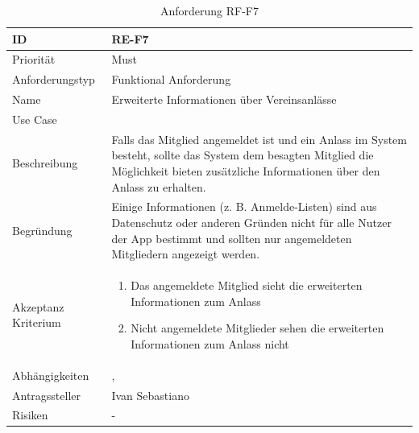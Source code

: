 \begin{table}[ht]
\centering
  \begin{tabular}{ l | p{8cm} }
	\hline
	\rowcolor{gray}
	ID 			&	\textbf{RE-F7}\\ \hline
	Priorität 		&	Must\\ \hline
	Anforderungstyp	&	Funktional Anforderung\\ \hline
	Name 			&	Erweiterte Informationen über Vereinsanlässe\\ \hline
	Use Case 		&	\nameref{table:use_case_5}\\ \hline
	Beschreibung 	&	Falls das Mitglied angemeldet ist und ein Anlass im System besteht, sollte das System dem besagten Mitglied die Möglichkeit bieten zusätzliche Informationen über den Anlass zu erhalten.\\ \hline
	Begründung 		&	Einige Informationen (z. B. Anmelde-Listen) sind aus Datenschutz oder anderen Gründen nicht für alle Nutzer der App bestimmt und sollten nur angemeldeten Mitgliedern angezeigt werden.\\ \hline
	Akzeptanz Kriterium	&	\begin{enumerate}
					\item Das angemeldete Mitglied sieht die erweiterten Informationen zum Anlass
					\item Nicht angemeldete Mitglieder sehen die erweiterten Informationen zum Anlass nicht
					\end{enumerate}
					\\ \hline
	Abhängigkeiten 	&	\nameref{table:req_1}, \nameref{table:req_6}\\ \hline
	Antragssteller 	&	Ivan Sebastiano\\ \hline
	Risiken	 	&	-
  \end{tabular}
   \caption{Anforderung RF-F7}\label{table:req_7}
\end{table}

